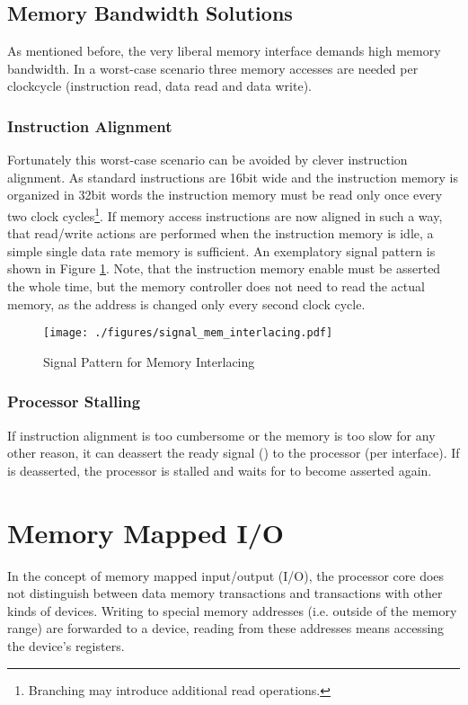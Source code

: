 \subsection{Memory Bandwidth Solutions}
As mentioned before, the very liberal memory interface demands high memory bandwidth.
In a worst-case scenario three memory accesses are needed per clockcycle (instruction read, data read and data write).

\subsubsection{Instruction Alignment}
Fortunately this worst-case scenario can be avoided by clever instruction alignment.
As standard instructions are 16bit wide and the instruction memory is organized
in 32bit words the instruction memory must be read only once every two clock cycles\footnote{Branching may introduce additional read operations.}.
If memory access instructions are now aligned in such a way, that read/write actions are performed when the instruction memory is idle, a simple single data rate memory is sufficient.
An exemplatory signal pattern is shown in Figure \ref{fig:signal_mem_interlacing}.
Note, that the instruction memory enable must be asserted the whole time,
but the memory controller does not need to read the actual memory,
as the address is changed only every second clock cycle.

\begin{figure}[htb]
	\centering
	\texttt{[image: ./figures/signal\_mem\_interlacing.pdf]}
	\caption{Signal Pattern for Memory Interlacing}
	\label{fig:signal_mem_interlacing}
\end{figure}

\subsubsection{Processor Stalling}
If instruction alignment is too cumbersome or the memory is too slow for any other reason, it can deassert the ready signal () to the processor (per interface).
If  is deasserted, the processor is stalled and waits for  to become asserted again.

\section{Memory Mapped I/O}
\label{sec:memmappedio}
In the concept of memory mapped input/output (I/O), the processor core does not distinguish between data memory transactions and transactions with other kinds of devices.
Writing to special memory addresses (i.e. outside of the memory range) are forwarded to a device, reading from these addresses means accessing the device's registers.

